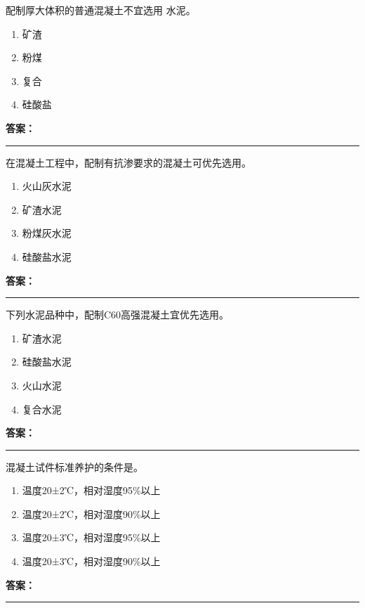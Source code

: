 \documentclass[UTF8,fontset=fandol,11pt]{ctexart}
\newcommand{\answerline}{\textcolor{answerred}{\rule{2.4cm}{0.7pt}}}
\begin{document}
\begin{quizbox}[title={第 49 题}]
配制厚大体积的普通混凝土不宜选用 水泥。\\
\begin{enumerate}[label=\Alph*.]
\item 矿渣
\item 粉煤
\item 复合
\item 硅酸盐
\end{enumerate}
\textbf{\textcolor{answerred}{答案：}} \answerline
\end{quizbox}

\begin{quizbox}[title={第 50 题}]
在混凝土工程中，配制有抗渗要求的混凝土可优先选用。\\
\begin{enumerate}[label=\Alph*.]
\item 火山灰水泥
\item 矿渣水泥
\item 粉煤灰水泥
\item 硅酸盐水泥
\end{enumerate}
\textbf{\textcolor{answerred}{答案：}} \answerline
\end{quizbox}

\begin{quizbox}[title={第 51 题}]
下列水泥品种中，配制C60高强混凝土宜优先选用。\\
\begin{enumerate}[label=\Alph*.]
\item 矿渣水泥
\item 硅酸盐水泥
\item 火山水泥
\item 复合水泥
\end{enumerate}
\textbf{\textcolor{answerred}{答案：}} \answerline
\end{quizbox}

\begin{quizbox}[title={第 52 题}]
混凝土试件标准养护的条件是。\\
\begin{enumerate}[label=\Alph*.]
\item 温度20±2℃，相对湿度95\%以上
\item 温度20±2℃，相对湿度90\%以上
\item 温度20±3℃，相对湿度95\%以上
\item 温度20±3℃，相对湿度90\%以上
\end{enumerate}
\textbf{\textcolor{answerred}{答案：}} \answerline
\end{quizbox}
\end{document}

